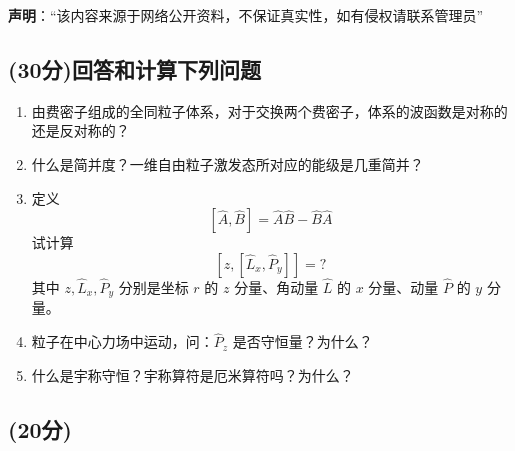 
\textbf{声明}：“该内容来源于网络公开资料，不保证真实性，如有侵权请联系管理员”

\subsection{(30分)回答和计算下列问题}
\begin{enumerate}
\item 由费密子组成的全同粒子体系，对于交换两个费密子，体系的波函数是对称的还是反对称的？
\item 什么是简并度？一维自由粒子激发态所对应的能级是几重简并？
\item 定义
\[
[\hat{A}, \hat{B}] = \hat{A} \hat{B} - \hat{B} \hat{A} ~
\]
试计算
\[
[z, [\hat{L}_x, \hat{P}_y]] = ?~
\]
其中 $z, \hat{L}_x, \hat{P}_y$ 分别是坐标 $r$ 的 $z$ 分量、角动量 $\hat{L}$ 的 $x$ 分量、动量 $\hat{P}$ 的 $y$ 分量。
\item 粒子在中心力场中运动，问：$\hat P_z$ 是否守恒量？为什么？
\item 什么是宇称守恒？宇称算符是厄米算符吗？为什么？
\end{enumerate}
\subsection{(20分)}